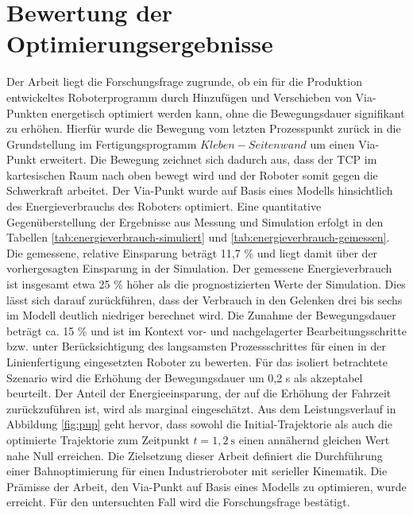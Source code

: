 \chapter{Bewertung der Optimierungsergebnisse}
\label{cha:Bewertung}
Der Arbeit liegt die Forschungsfrage zugrunde, ob ein für die Produktion entwickeltes Roboterprogramm durch Hinzufügen und Verschieben von Via-Punkten energetisch optimiert werden kann, ohne die Bewegungsdauer signifikant zu erhöhen. Hierfür wurde die Bewegung vom letzten Prozesspunkt zurück in die Grundstellung im Fertigungsprogramm  $Kleben-Seitenwand$  um einen Via-Punkt erweitert.  Die Bewegung zeichnet sich dadurch aus, dass der TCP im kartesischen Raum nach oben bewegt wird und der Roboter somit gegen die Schwerkraft arbeitet. Der Via-Punkt wurde auf Basis eines Modells hinsichtlich des Energieverbrauchs des Roboters optimiert. Eine quantitative Gegenüberstellung der Ergebnisse aus Messung und Simulation erfolgt in den Tabellen \ref{tab:energieverbrauch-simuliert} und \ref{tab:energieverbrauch-gemessen}. Die gemessene, relative Einsparung beträgt 11,7 \% und liegt damit über der vorhergesagten Einsparung in der Simulation. Der gemessene Energieverbrauch ist insgesamt etwa 25 \% höher als die prognostizierten Werte der Simulation. Dies lässt sich darauf zurückführen, dass der Verbrauch in den Gelenken drei bis sechs im Modell deutlich niedriger berechnet wird. Die Zunahme der Bewegungsdauer beträgt ca. 15 \% und ist im Kontext vor- und nachgelagerter Bearbeitungsschritte bzw. unter Berücksichtigung des langsamsten Prozessschrittes für einen in der Linienfertigung eingesetzten Roboter zu bewerten.  Für das isoliert betrachtete Szenario wird die Erhöhung der Bewegungsdauer um 0,2 s als akzeptabel beurteilt.
Der Anteil der Energieeinsparung, der auf die Erhöhung der Fahrzeit zurückzuführen ist, wird als marginal eingeschätzt. Aus dem Leistungsverlauf in Abbildung \ref{fig:pup} geht hervor, dass sowohl die Initial-Trajektorie als auch die optimierte Trajektorie zum Zeitpunkt $t = 1,2~\text{s}$ einen annähernd gleichen Wert nahe Null erreichen. 
%
Die Zielsetzung dieser Arbeit definiert die Durchführung einer Bahnoptimierung für einen Industrieroboter mit serieller Kinematik. Die Prämisse der Arbeit, den Via-Punkt auf Basis eines Modells zu optimieren, wurde erreicht. Für den untersuchten Fall wird die Forschungsfrage bestätigt.
%
